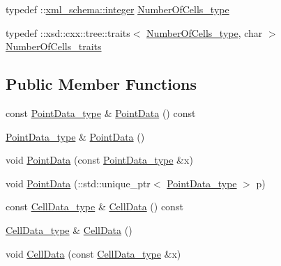 \begin{DoxyCompactItemize}
\item 
typedef \+::\hyperlink{namespacexml__schema_aaaea7c8ce4dfbe26cc52c91c29c97b7c}{xml\+\_\+schema\+::integer} \hyperlink{classPieceUnstructuredGrid__t_aeae5546900c50a4abe9b3aea485e97d0}{Number\+Of\+Cells\+\_\+type}
\item 
typedef \+::xsd\+::cxx\+::tree\+::traits$<$ \hyperlink{classPieceUnstructuredGrid__t_aeae5546900c50a4abe9b3aea485e97d0}{Number\+Of\+Cells\+\_\+type}, char $>$ \hyperlink{classPieceUnstructuredGrid__t_a7c7607d306bde9e187b9cb3f570d6155}{Number\+Of\+Cells\+\_\+traits}
\end{DoxyCompactItemize}
\subsection*{Public Member Functions}
\begin{DoxyCompactItemize}
\item 
const \hyperlink{classPieceUnstructuredGrid__t_a5d79d8ea03ca53f80f24e62c2175ec02}{Point\+Data\+\_\+type} \& \hyperlink{classPieceUnstructuredGrid__t_a4825627cfe05949b680c81826e9d4ea5}{Point\+Data} () const 
\item 
\hyperlink{classPieceUnstructuredGrid__t_a5d79d8ea03ca53f80f24e62c2175ec02}{Point\+Data\+\_\+type} \& \hyperlink{classPieceUnstructuredGrid__t_af3a9955626dac2aad17bf879a77d2c0d}{Point\+Data} ()
\item 
void \hyperlink{classPieceUnstructuredGrid__t_aee7745ad1ce39af5fc048e50acb76424}{Point\+Data} (const \hyperlink{classPieceUnstructuredGrid__t_a5d79d8ea03ca53f80f24e62c2175ec02}{Point\+Data\+\_\+type} \&x)
\item 
void \hyperlink{classPieceUnstructuredGrid__t_afb1080839846979d1870125471277dc2}{Point\+Data} (\+::std\+::unique\+\_\+ptr$<$ \hyperlink{classPieceUnstructuredGrid__t_a5d79d8ea03ca53f80f24e62c2175ec02}{Point\+Data\+\_\+type} $>$ p)
\item 
const \hyperlink{classPieceUnstructuredGrid__t_a4232a7b88477ee6f692a4e5fab6a65d1}{Cell\+Data\+\_\+type} \& \hyperlink{classPieceUnstructuredGrid__t_a7c7be2b175fa0ec2fc403bb4740865c1}{Cell\+Data} () const 
\item 
\hyperlink{classPieceUnstructuredGrid__t_a4232a7b88477ee6f692a4e5fab6a65d1}{Cell\+Data\+\_\+type} \& \hyperlink{classPieceUnstructuredGrid__t_a679db045d830876cce6fe04767e7c611}{Cell\+Data} ()
\item 
void \hyperlink{classPieceUnstructuredGrid__t_a6fd0984f28544ef312e860cac18e7144}{Cell\+Data} (const \hyperlink{classPieceUnstructuredGrid__t_a4232a7b88477ee6f692a4e5fab6a65d1}{Cell\+Data\+\_\+type} \&x)

\end{DoxyCompactItemize}
